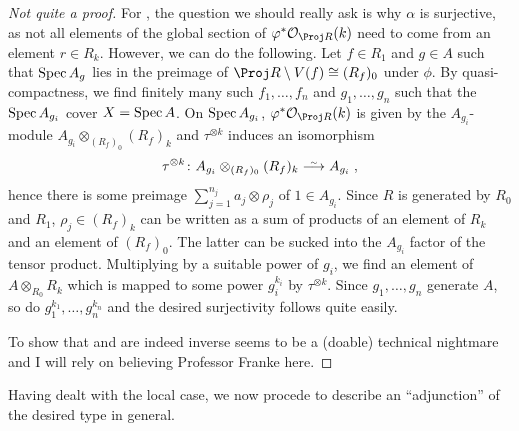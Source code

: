 \documentclass[a4paper,parskip=half,numbers=enddot, DIV=12]{scrreprt}
\begin{document}
\begin{proof}[Not quite a proof]
	For , the question we should really ask is why $\alpha$ is surjective, as not all elements of the global section of $\phi^*\Oo_{\Proj R}(k)$ need to come from an element $r\in R_k$. However, we can do the following. Let $f\in R_1$ and $g\in A$ such that $\operatorname{Spec} A_g$ lies in the preimage of $\Proj R\setminus V(f)\cong (R_f)_0$ under $\phi$. By quasi-compactness, we find finitely many such $f_1,\ldots,f_n$ and $g_1,\ldots,g_n$ such that the $\operatorname{Spec} A_{g_i}$ cover $X=\operatorname{Spec} A$. On $\operatorname{Spec} A_{g_i}$, $\phi^*\Oo_{\Proj R}(k)$ is given by the $A_{g_i}$-module $A_{g_i}\otimes_{(R_f)_0}(R_f)_k$ and $\tau^{\otimes k}$ induces an isomorphism
	\begin{align*}
		\tau^{\otimes k}\colon A_{g_i}\otimes_{(R_f)_0}(R_f)_k\isomorphism A_{g_i}\;,
	\end{align*}
	hence there is some preimage $\sum_{j=1}^{n_j}a_j\otimes \rho_j$ of $1\in A_{g_i}$. Since $R$ is generated by $R_0$ and $R_1$, $\rho_j\in (R_f)_k$ can be written as a sum of products of an element of $R_k$ and an element of $(R_f)_0$. The latter can be sucked into the $A_{g_i}$ factor of the tensor product. Multiplying by a suitable power of $g_i$, we find an element of $A\otimes_{R_0}R_k$ which is mapped to some power $g_i^{k_i}$ by $\tau^{\otimes k}$. Since $g_1,\ldots,g_n$ generate $A$, so do $g_1^{k_1},\ldots,g_n^{k_n}$ and the desired surjectivity follows quite easily.
	
	To show that  and  are indeed inverse seems to be a (doable) technical nightmare and I will rely on believing Professor Franke here.
\end{proof}
Having dealt with the local case, we now procede to describe an ``adjunction'' of the desired type in general. 
\end{document}
